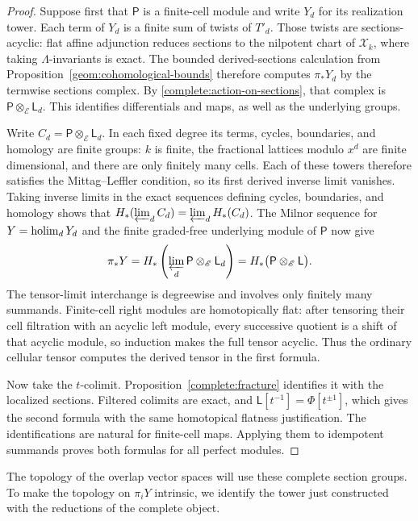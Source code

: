 \begin{proof}
Suppose first that $\mathsf P$ is a finite-cell module and write
$Y_d$ for its realization tower. Each term of $Y_d$ is a finite
sum of twists of $T'_d$. Those twists are sections-acyclic: flat
affine adjunction reduces sections to the nilpotent chart of
$\mathcal X_k$, where taking $\Lambda$-invariants is exact.
The bounded derived-sections calculation from
Proposition~\ref{geom:cohomological-bounds} therefore computes
$\pi_*Y_d$ by the termwise sections complex. By
\eqref{complete:action-on-sections}, that complex is
$\mathsf P\otimes_{\mathscr E}\mathsf L_d$. This identifies
differentials and maps, as well as the underlying groups.

Write $C_d=\mathsf P\otimes_{\mathscr E}\mathsf L_d$. In each fixed
degree its terms, cycles, boundaries, and homology are finite groups:
$k$ is finite, the fractional lattices modulo $x^d$ are finite
dimensional, and there are only finitely many cells. Each of these
towers therefore satisfies the Mittag--Leffler condition, so its first
derived inverse limit vanishes. Taking inverse limits in the exact
sequences defining cycles, boundaries, and homology shows that
$H_*(\varprojlim_d C_d)=\varprojlim_d H_*(C_d)$. The Milnor sequence
for $Y=\operatorname{holim}_dY_d$ and the finite graded-free underlying module of
$\mathsf P$ now give
\[
 \pi_*Y
 =H_*\left(\varprojlim_d
       \mathsf P\otimes_{\mathscr E}\mathsf L_d\right)
 =H_*\bigl(\mathsf P\otimes_{\mathscr E}\mathsf L\bigr).
\]
The tensor-limit interchange is degreewise and involves only finitely
many summands. Finite-cell right modules are homotopically flat: after
tensoring their cell filtration with an acyclic left module, every
successive quotient is a shift of that acyclic module, so induction
makes the full tensor acyclic. Thus the ordinary cellular tensor
computes the derived tensor in the first formula.

Now take the $t$-colimit. Proposition~\ref{complete:fracture} identifies
it with the localized sections. Filtered colimits are exact, and
$\mathsf L[t^{-1}]=\Phi[t^{\pm1}]$, which gives the second formula
with the same homotopical flatness justification. The identifications
are natural for finite-cell maps. Applying them to idempotent summands
proves both formulas for all perfect modules.
\end{proof}

The topology of the overlap vector spaces will use these complete
section groups. To make the topology on $\pi_iY$ intrinsic, we identify
the tower just constructed with the reductions of the complete object.

